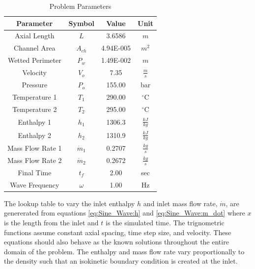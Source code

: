 \documentclass{mc2015}
\begin{document}
\begin{table}[h]
\center
\caption{Problem Parameters}
\label{table:parameters}
\begin{tabular}{|c|c|c|c|}
\hline
Parameter	&	Symbol	&	Value	&	Unit	\\ \hline
Axial Length	&	$L$	&	3.6586	&	$m$	\\ \hline
Channel Area	&	$A_{ch}$	&	4.94E-005	&	$m^{2}$	\\ \hline
Wetted Perimeter	&	$P_{w}$	&	1.49E-002	&	$m$	\\ \hline
Velocity	&	$V_{o}$	&	7.35	&	$\frac{m}{s}$	\\ \hline
Pressure	&	$P_{o}$	&	155.00	&	bar	\\ \hline
Temperature 1	&	$T_{1}$	&	290.00	&	$^{\circ}$C	\\ \hline
Temperature 2	&	$T_{2}$	&	295.00	&	$^{\circ}$C	\\ \hline
Enthalpy 1	&	$h_{1}$	&	1306.3	&	$\frac{kJ}{kg}$	\\ \hline
Enthalpy 2	&	$h_{2}$	&	1310.9	&	$\frac{kJ}{kg}$	\\ \hline
Mass Flow Rate 1	&	$\dot{m}_{1}$	&	0.2707	&	$\frac{kg}{s}$	\\ \hline
Mass Flow Rate 2	&	$\dot{m}_{2}$	&	0.2672	&	$\frac{kg}{s}$	\\ \hline
Final Time	&	$t_{f}$	&	2.00	&	sec	\\ \hline
Wave Frequency	&	$\omega$	&	1.00	&	Hz	\\ \hline
\end{tabular}
\end{table}

The lookup table to vary the inlet enthalpy $h$ and inlet mass
flow rate, $\dot{m}$, are genererated from equations \ref{eq:Sine_Wave:h} and
\ref{eq:Sine_Wave:m_dot} where $x$ is the length from the inlet and $t$ is the
simulated time. The trignometric functions assume constant axial spacing, time
step size, and velocity. These equations should also behave as the known
solutions throughout the entire domain of the problem. The enthalpy and mass
flow rate vary proportionally to the density such that an isokinetic boundary
condition is created at the inlet. 

%
%
%
\end{document}
